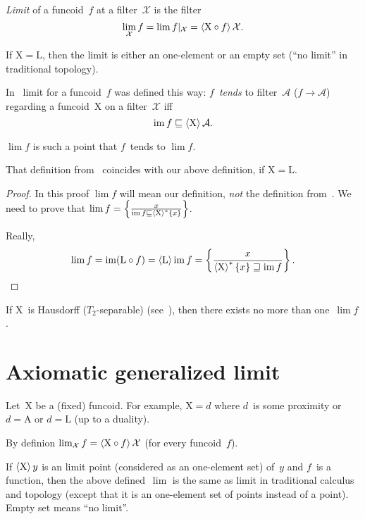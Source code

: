 \begin{defn}
\emph{Limit} of a funcoid~$f$ at a filter~$\mathcal{X}$ is
the filter \[ \lim_{\mathcal{X}}f=\lim f|_{\mathcal{X}}=\left\langle \mathrm{X}\circ f\right\rangle\mathcal{X}. \]
\end{defn}

\begin{rem}
If $\mathrm{X}=\mathrm{L}$, then the limit is either an one-element or an empty set (``no limit'' in traditional topology).
\end{rem}

In~\cite{volume-1-edition1} limit for a funcoid~$f$ was defined this way: $f$~\emph{tends} to filter~$\mathcal{A}$ ($f\to \mathcal{A}$) regarding a funcoid~$\mathrm{X}$ on a filter~$\mathcal{X}$ iff
\[ \operatorname{im} f \sqsubseteq \left\langle \mathrm{X}\right\rangle\mathcal{A}. \]

$\lim f$ is such a point that $f$~tends to $\lim f$.

\begin{prop}
That definition from~\cite{volume-1-edition1} coincides with
our above definition, if $\mathrm{X}=\mathrm{L}$.
\end{prop}

\begin{proof}
In this proof $\lim f$ will mean our definition, \emph{not} the definition from~\cite{volume-1-edition1}. We need to prove that
$\lim f=\left\{ \frac{x}{\operatorname{im} f\sqsubseteq\left\langle \mathrm{X}\right\rangle ^{\ast}\{x\}}\right\}$.

Really,
\[
\lim f=\operatorname{im}(\mathrm{L}\circ f) = 
\left\langle \mathrm{L}\right\rangle\operatorname{im} f =
\left\{ \frac{x}{\left\langle \mathrm{X}\right\rangle ^{\ast}\{x\}\sqsupseteq\operatorname{im} f}\right\}.
\]
\end{proof}

If $\mathrm{X}$~is Hausdorff ($T_2$-separable) (see~\cite{volume-1-edition1}), then there exists no more than one~$\lim f$.

\chapter{Axiomatic generalized limit}

Let~$\mathrm{X}$ be a (fixed) funcoid. For example, $\mathrm{X}=d$ where $d$~is
some proximity or $d=\mathrm{A}$ or $d=\mathrm{L}$ (up to a duality).

By definion $\lim_{\mathcal{X}}f = \left\langle \mathrm{X}\circ f\right\rangle\mathcal{X}$ (for every funcoid~$f$).

\begin{rem}
If $\left\langle \mathrm{X}\right\rangle y$ is an limit point (considered as an one-element set) of~$y$ and $f$~is a function, then the above
defined~$\lim$ is the
same as limit in traditional calculus and topology (except
that it is an one-element set of points instead of a point).
Empty set means ``no limit''.
\end{rem}

